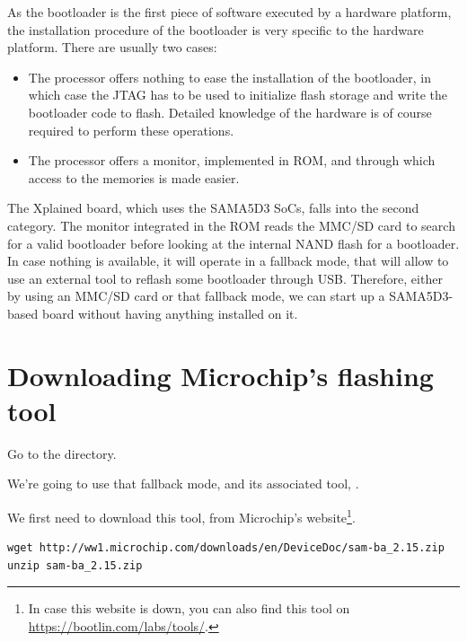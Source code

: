 
As the bootloader is the first piece of software executed by a
hardware platform, the installation procedure of the bootloader is
very specific to the hardware platform. There are usually two cases:

\begin{itemize}

\item The processor offers nothing to ease the installation of the
  bootloader, in which case the JTAG has to be used to initialize
  flash storage and write the bootloader code to flash. Detailed
  knowledge of the hardware is of course required to perform these
  operations.

\item The processor offers a monitor, implemented in ROM, and through
  which access to the memories is made easier.

\end{itemize}

The Xplained board, which uses the SAMA5D3 SoCs, falls into the second
category. The monitor integrated in the ROM reads the MMC/SD card to
search for a valid bootloader before looking at the internal NAND
flash for a bootloader. In case nothing is available, it will operate
in a fallback mode, that will allow to use an external tool
to reflash some bootloader through USB. Therefore, either by using an MMC/SD
card or that fallback mode, we can start up a SAMA5D3-based board
without having anything installed on it.

\section{Downloading Microchip's flashing tool}

Go to the  directory.

We're going to use that fallback mode, and its associated tool,
.

We first need to download this tool, from Microchip's website\footnote{
In case this website is down, you can also find this
tool on \url{https://bootlin.com/labs/tools/}.}.

\begin{verbatim}
wget http://ww1.microchip.com/downloads/en/DeviceDoc/sam-ba_2.15.zip 
unzip sam-ba_2.15.zip
\end{verbatim}

